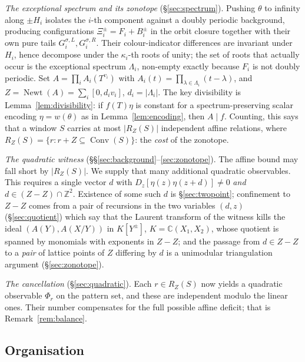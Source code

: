 \documentclass[11pt,reqno]{amsart}
\theoremstyle{plain}
\theoremstyle{definition}
\theoremstyle{remark}
\theoremstyle{plain}
\theoremstyle{remark}
\theoremstyle{definition}
\numberwithin{equation}{section}
\DeclareMathOperator{\Conv}{Conv}
\DeclareMathOperator{\Newt}{Newt}
\newcommand{\Z}{\mathbb{Z}}
\newcommand{\C}{\mathbb{C}}
\begin{document}
\emph{The exceptional spectrum and its zonotope} (\S\ref{sec:spectrum}).
Pushing $\theta$ to infinity along $\pm H_i$ isolates the $i$-th component
against a doubly periodic background, producing configurations
$\Xi_i^\pm=F_i+B_i^\pm$ in the orbit closure together with their own pure tails
$G_i^{\sigma,L},G_i^{\sigma,R}$.  Their colour-indicator differences are invariant
under $H_i$, hence decompose under the $\kappa_i$-th roots of unity; the set of
roots that actually occur is the exceptional spectrum $\Lambda_i$, non-empty
exactly because $F_i$ is not doubly periodic.  Set
$A=\prod_iA_i(T^{v_i})$ with $A_i(t)=\prod_{\lambda\in\Lambda_i}(t-\lambda)$,
and $Z=\Newt(A)=\sum_i[0,d_iv_i]$, $d_i=|\Lambda_i|$.  The key divisibility is
Lemma~\ref{lem:divisibility}: if $f(T)\eta$ is constant for a spectrum-preserving
scalar encoding $\eta=w(\theta)$ as in Lemma~\ref{lem:encoding}, then $A\mid f$.
Counting, this says that a window $S$
carries at most $|R_Z(S)|$ independent affine relations, where
$R_Z(S)=\{r:r+Z\subseteq\Conv(S)\}$: the \emph{cost} of the zonotope.

\emph{The quadratic witness} (\S\S\ref{sec:background}--\ref{sec:zonotope}).
The affine bound may fall short by $|R_Z(S)|$.  We supply that many additional
quadratic observables.  This requires a single vector $d$ with
$D_z[\eta(z)\eta(z+d)]\ne0$ \emph{and} $d\in(Z-Z)\cap\Z^2$.  Existence of some
such $d$ is \S\ref{sec:twopoint}; confinement to $Z-Z$ comes from a pair of
recursions in the two variables $(d,z)$ (\S\ref{sec:quotient}) which say that
the Laurent transform of the witness kills the ideal $(A(Y),A(X/Y))$ in
$K[Y^{\pm}]$, $K=\C(X_1,X_2)$, whose quotient is spanned by monomials with
exponents in $Z-Z$; and the passage from $d\in Z-Z$ to a \emph{pair} of lattice
points of $Z$ differing by $d$ is a unimodular triangulation argument
(\S\ref{sec:zonotope}).

\emph{The cancellation} (\S\ref{sec:quadratic}).  Each $r\in R_Z(S)$ now yields
a quadratic observable $\Phi_r$ on the pattern set, and these are independent
modulo the linear ones.  Their number compensates for the full possible affine
deficit; that is Remark~\ref{rem:balance}.

\subsection*{Organisation}
\end{document}
